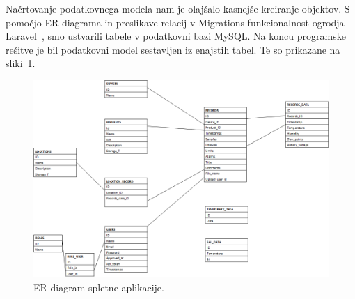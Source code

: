 \documentclass[a4paper, 12pt]{book}
\begin{document}
Načrtovanje podatkovnega modela nam je olajšalo kasnejše kreiranje objektov. S pomočjo ER diagrama in preslikave relacij v Migrations funkcionalnost ogrodja Laravel~\cite{laravel-migrations}, smo ustvarili tabele v podatkovni bazi MySQL. Na koncu programske rešitve je bil podatkovni model sestavljen iz enajstih tabel. Te so prikazane na sliki~\ref{database-model}.

\begin{figure}[t]
\begin{center}
\includegraphics[width=\textwidth]{slike/database_model-updated-for-diploma-1.png}
\end{center}
\caption{ER diagram spletne aplikacije.}
\label{database-model}
\end{figure}
\end{document}
